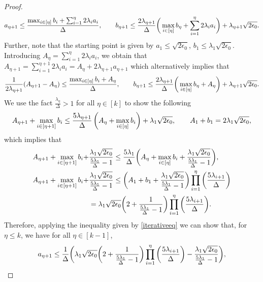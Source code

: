 \begin{proof}
    \begin{align*}
    a_{\eta+1}\leq\frac{\max_{i\in[\eta]}b_{i}+\sum_{i=1}^{\eta}2\lambda_i a_i}{\Delta},\qquad b_{\eta+1}\leq\frac{2\lambda_{\eta+1}}{\Delta}{\bigg (}\max_{i\in[\eta]}b_{\eta}+\sum_{i=1}^{\eta} 2\lambda_ia_i{\bigg )}+\lambda_{\eta+1}\sqrt{2\epsilon_0}.
    \end{align*}
    Further, note that the starting point is given by
    $a_{1}\leq \sqrt{2\epsilon_0}$, $b_1\leq\lambda_{1}\sqrt{2\epsilon_0}$. Introducing $A_{\eta}=\sum_{i=1}^{\eta} 2\lambda_ia_i$, we obtain that
$        A_{\eta+1} =\sum_{i=1}^{\eta+1}2\lambda_ia_i = A_{\eta}+2\lambda_{\eta+1}a_{\eta+1}$ which alternatively implies that
    \begin{align*}
        \frac{1}{2\lambda_{\eta+1}}(A_{\eta+1}-A_{\eta})\leq\frac{\max_{i\in[\eta]}b_i+A_{\eta}}{\Delta},\qquad b_{\eta+1}\leq\frac{2\lambda_{\eta+1}}{\Delta}{\bigg (}\max_{i\in[\eta]}b_{\eta}+A_{\eta}{\bigg )}+\lambda_{\eta+1}\sqrt{2\epsilon_0}.
    \end{align*}
    We use the fact 
        $\frac{\lambda_{\eta}}{\Delta}>1$ for all $\eta\in[k]$
    to show the following
    \begin{align*}
A_{\eta+1}+\max_{i\in[\eta+1]}b_i\leq\frac{5\lambda_{\eta+1}}{\Delta}\left(A_{\eta}+\max_{i\in[\eta]} b_i\right)+\lambda_1\sqrt{2\epsilon_0}, \qquad A_1+b_1=2\lambda_1\sqrt{2\epsilon_0},
    \end{align*}
    which implies that
    \begin{align}\label{iterativeeq}
    A_{\eta+1}+\max_{i\in[\eta+1]}b_i+&\frac{\lambda_1\sqrt{2\epsilon_0}}{\frac{5\lambda_{1}}{\Delta}-1}\leq\frac{5\lambda_{1}}{\Delta}{\bigg (} A_{\eta}+\max_{i\in[\eta]}b_i +\frac{\lambda_1\sqrt{2\epsilon_0}}{\frac{5\lambda_{1}}{\Delta}-1}{\bigg )},\nonumber\\
        A_{\eta+1}+\max_{i\in[\eta+1]}b_i+&\frac{\lambda_1\sqrt{2\epsilon_0}}{\frac{5\lambda_{1}}{\Delta}-1}\leq{\bigg (} A_1+b_1+\frac{\lambda_1\sqrt{2\epsilon_0}}{\frac{5\lambda_1}{\Delta}-1}{\bigg )}\prod_{i=1}^{\eta}{\bigg (}\frac{5\lambda_{i+1}}{\Delta}{\bigg )}\nonumber\\
        &=\lambda_1\sqrt{2\epsilon_0}{\bigg (} 2+\frac{1}{\frac{5\lambda_1}{\Delta}-1} {\bigg )}\prod_{i=1}^{\eta}{\bigg (}\frac{5\lambda_{i+1}}{\Delta}{\bigg )}.
    \end{align}
    Therefore, applying the inequality given by \eqref{iterativeeq} we can show that, for $\eta\leq k$, we have for all $\eta\in[k-1]$,
    \begin{align*}
        a_{\eta+1}&\leq\frac{1}{\Delta}\bl \lambda_1\sqrt{2\epsilon_0}\bl 2+\frac{1}{\frac{5\lambda_1}{\Delta}-1}\br\prod_{i=1}^{\eta}\bl\frac{5\lambda_{i+1}}{\Delta}\br-\frac{\lambda_1\sqrt{2\epsilon_0}}{\frac{5\lambda_1}{\Delta}-1}\br,\\

\end{align*}
\end{proof}
